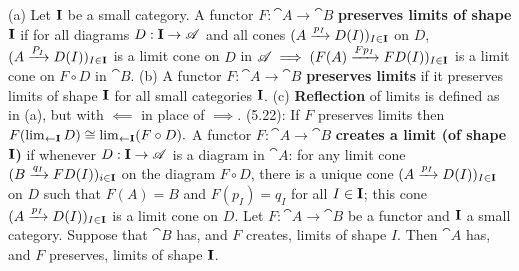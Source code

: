  (a) Let $\mathbf{I}$ be a small category. A functor $F: \cat A \to \cat B$ \textbf{preserves limits of shape $\mathbf{I}$} if for all diagrams $D: \mathbf{I} \to \mathscr{A}$ and all cones $(A \xrightarrow[]{p_I} D(I))_{I \in \mathbf{I}}$ on $D$, 
$(A \xrightarrow[]{P_I} D(I))_{I \in \mathbf{I}}$ is a limit cone on $D$ in $\mathscr{A} \implies (F(A) \xrightarrow[]{Fp_I} FD(I))_{I \in \mathbf{I}}$  is a limit cone on $F \circ D$ in $\cat B$.
(b) A functor $F : \cat A \to \cat B$ \textbf{preserves limits} if it preserves limits of shape $\mathbf{I}$ for all small categories $\mathbf{I}$.
(c) \textbf{Reflection} of limits is defined as in (a), but with $\impliedby$ in place of $\implies$.
(5.22): If $F$ preserves limits then $F( \lim_{\leftarrow \mathbf{I}} D )\cong \lim_{\leftarrow \mathbf{I}}(F \circ D ).$
 A functor $F: \cat A \to \cat B$ \textbf{creates a limit (of shape $\mathbf{I}$)} if whenever $D: \mathbf{I} \to \mathscr{A}$ is a diagram in $\cat A$:
for any limit cone $(B \xrightarrow[]{q_I} FD(I))_{i \in \mathbf{I}}$ on the diagram $F \circ D$, there is a unique cone $(A \xrightarrow[]{p_I} D(I))_{I \in \mathbf{I}}$ on $D$ such that $F(A) = B$ and $F(p_I) = q_I$ for all $I \in \mathbf{I}$;
this cone $(A \xrightarrow[]{p_I} D(I))_{I \in \mathbf{I}}$ is a limit cone on $D$.
 Let $F : \cat A \to \cat B$ be a functor and $\mathbf{I}$ a small category. Suppose that $\cat B$ has, and $F$ creates, limits of shape $I$. Then $\cat A$ has, and $F$ preserves, limits of shape $\mathbf{I}$.
